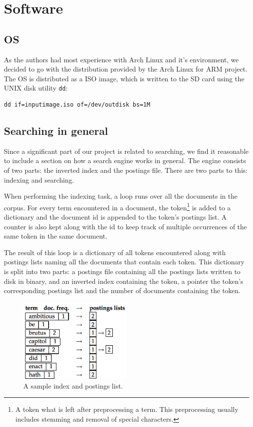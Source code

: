 \clearpage
\section{Software}
\label{sec:software}

\subsection{OS}
As the authors had most experience with Arch Linux and it's environment, we decided to go with the distribution provided by the Arch Linux for ARM project.
The OS is distributed as a ISO image, which is written to the SD card using the UNIX disk utility {\tt dd}:
\begin{lstlisting}
dd if=inputimage.iso of=/dev/outdisk bs=1M
\end{lstlisting}

\subsection{Searching in general}
Since a significant part of our project is related to searching, we find it reasonable to include a section on how a search engine works in general. The engine consists of two parts: the inverted index and the postings file. There are two parts to this: indexing and searching.\cite{IntroIR}

When performing the indexing task, a loop runs over all the documents in the corpus. For every term encountered in a document, the token\footnote{A token what is left after preprocessing a term. This preprocessing usually includes stemming and removal of special characters.} is added to a dictionary and the document id is appended to the token's postings list. A counter is also kept along with the id to keep track of multiple occurrences of the same token in the same document.

The result of this loop is a dictionary of all tokens encountered along with postings lists naming all the documents that contain each token. This dictionary is split into two parts: a postings file containing all the  postings lists written to disk in binary, and an inverted index containing the token, a pointer the token's corresponding postings list and the number of documents containing the token.

\begin{figure}[h]
    \includegraphics[width=0.5\textwidth]{software/index_postings_lists}
    \caption{A sample index and postings list.\cite{IntroIR}}
    \label{fig:index_postings_lists_sw}
\end{figure}


